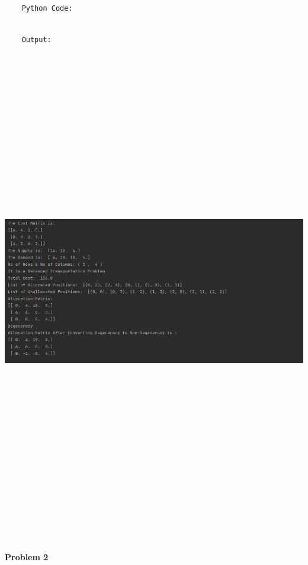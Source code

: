 \documentclass[12pt, letterpaper, twoside]{book}
\begin{document}
\begin{lstlisting}

	Python Code:

\end{lstlisting}

\pagebreak
\begin{lstlisting}

	Output:

\end{lstlisting}

\includegraphics[height=600pt,width=550pt]{Output1}
\pagebreak
\begin{center}
\textbf{\\Problem 2}
\end{center}
\end{document}
